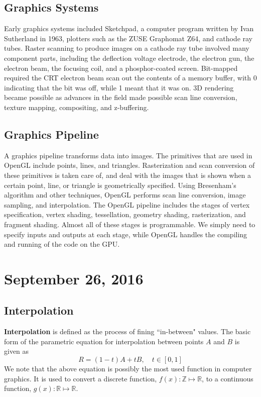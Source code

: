 \documentclass[11pt]{article}
\theoremstyle{plain} %
\theoremstyle{definition}
\theoremstyle{example}
\theoremstyle{remark}
\begin{document}
\subsection{Graphics Systems}

Early graphics systems included Sketchpad, a computer program written by Ivan Sutherland in 1963, plotters such as the ZUSE Graphomat Z64, and cathode ray tubes. Raster scanning to produce images on a cathode ray tube involved many component parts, including the deflection voltage electrode, the electron gun, the electron beam, the focusing coil, and a phosphor-coated screen. Bit-mapped required the CRT electron beam scan out the contents of a memory buffer, with 0 indicating that the bit was off, while 1 meant that it was on. 3D rendering became possible as advances in the field made possible scan line conversion, texture mapping, compositing, and z-buffering. 

\subsection{Graphics Pipeline}


A graphics pipeline transforms data into images. The primitives that are used in OpenGL include points, lines, and triangles. Rasterization and scan conversion of these primitives is taken care of, and deal with the images that is shown when a certain point, line, or triangle is geometrically specified. Using Bresenham's algorithm and other techniques, OpenGL performs scan line conversion, image sampling, and interpolation. The OpenGL pipeline includes the stages of vertex specification, vertex shading, tessellation, geometry shading, rasterization, and fragment shading. Almost all of these stages is programmable. We simply need to specify inputs and outputs at each stage, while OpenGL handles the compiling and running of the code on the GPU. 

\section{September 26, 2016}

\subsection{Interpolation}

\textbf{Interpolation} is defined as the process of fining ``in-between" values. The basic form of the parametric equation for interpolation between points $A$ and $B$ is given as
$$R = (1-t)A + tB, \quad t\in[0,1]$$
We note that the above equation is possibly the most used function in computer graphics. It is used to convert a discrete function, $f(x):\mathbb Z \mapsto \mathbb R $, to a continuous function, $g(x):\mathbb R \mapsto \mathbb R$.
\end{document}
